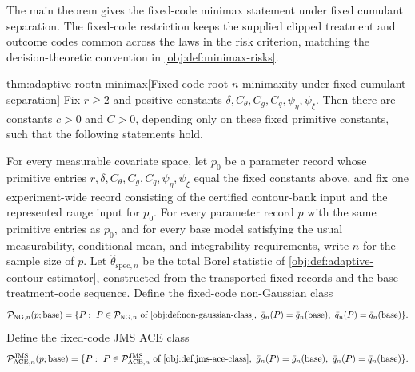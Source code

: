The main theorem gives the fixed-code minimax statement under fixed cumulant separation. The fixed-code restriction keeps the supplied clipped treatment and outcome codes common across the laws in the risk criterion, matching the decision-theoretic convention in \cref{obj:def:minimax-risks}.

\begin{theoremv}{thm:adaptive-rootn-minimax}[Fixed-code root-\(n\) minimaxity under fixed cumulant separation]
Fix \(r\ge 2\) and positive constants \(\delta,C_{\theta},C_g,C_q,\psi_{\eta},\psi_{\xi}\).  Then there are constants \(c>0\) and \(C>0\), depending only on these fixed primitive constants, such that the following statements hold.

For every measurable covariate space, let \(p_0\) be a parameter record whose primitive entries \(r,\delta,C_{\theta},C_g,C_q,\psi_{\eta},\psi_{\xi}\) equal the fixed constants above, and fix one experiment-wide record consisting of the certified contour-bank input and the represented range input for \(p_0\).  For every parameter record \(p\) with the same primitive entries as \(p_0\), and for every base model satisfying the usual measurability, conditional-mean, and integrability requirements, write \(n\) for the sample size of \(p\).  Let \(\widehat\theta_{\mathrm{spec},n}\) be the total Borel statistic of \cref{obj:def:adaptive-contour-estimator}, constructed from the transported fixed records and the base treatment-code sequence.  Define the fixed-code non-Gaussian class
\[
\mathcal P_{\mathrm{NG},n}(p;\mathrm{base})
=
\{P:\ P\in\mathcal P_{\mathrm{NG},n}\text{ of }\cref{obj:def:non-gaussian-class},\ 
\bar g_n(P)=\bar g_n(\mathrm{base}),\ 
\bar q_n(P)=\bar q_n(\mathrm{base})\}.
\]
Define the fixed-code JMS ACE class
\[
\mathcal P_{\mathrm{ACE},n}^{\mathrm{JMS}}(p;\mathrm{base})
=
\{P:\ P\in\mathcal P_{\mathrm{ACE},n}^{\mathrm{JMS}}\text{ of }\cref{obj:def:jms-ace-class},\ 
\bar g_n(P)=\bar g_n(\mathrm{base}),\ 
\bar q_n(P)=\bar q_n(\mathrm{base})\}.
\]


\end{theoremv}

